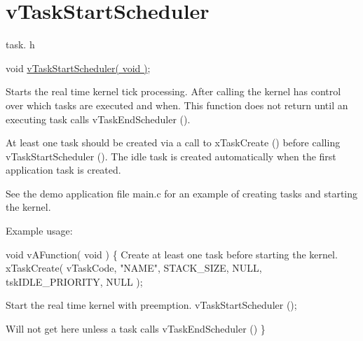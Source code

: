\hypertarget{group__v_task_start_scheduler}{\section{v\-Task\-Start\-Scheduler}
\label{group__v_task_start_scheduler}
}
task. h 
\begin{DoxyPre}void \hyperlink{win32_2win32_2_libraries_2_free_r_t_o_s_2_source_2tasks_8c_a598661cdd2a6af95a077245d11e3d142}{vTaskStartScheduler( void )};\end{DoxyPre}


Starts the real time kernel tick processing. After calling the kernel has control over which tasks are executed and when. This function does not return until an executing task calls v\-Task\-End\-Scheduler ().

At least one task should be created via a call to x\-Task\-Create () before calling v\-Task\-Start\-Scheduler (). The idle task is created automatically when the first application task is created.

See the demo application file main.\-c for an example of creating tasks and starting the kernel.

Example usage\-: 
\begin{DoxyPre}
 void vAFunction( void )
 \{
Create at least one task before starting the kernel.
         xTaskCreate( vTaskCode, "NAME", STACK\_SIZE, NULL, tskIDLE\_PRIORITY, NULL );\end{DoxyPre}



\begin{DoxyPre}Start the real time kernel with preemption.
         vTaskStartScheduler ();\end{DoxyPre}



\begin{DoxyPre}Will not get here unless a task calls vTaskEndScheduler ()
 \}
   \end{DoxyPre}
 